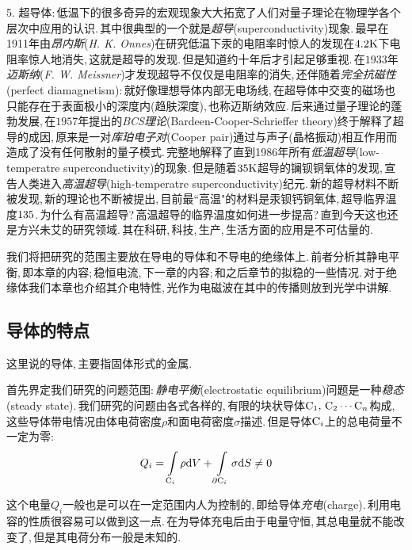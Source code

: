 	\vspace{0.3cm} 5. 超导体:\,低温下的很多奇异的宏观现象大大拓宽了人们对量子理论在物理学各个层次中应用的认识.\,其中很典型的一个就是\emph{超导}(superconductivity)现象.\,最早在1911年由\emph{昂内斯}({\it H. K. Onnes})在研究低温下汞的电阻率时惊人的发现在$4.2{\rm K}$下电阻率惊人地消失,\,这就是超导的发现.\,但是知道约十年后才引起足够重视.\,在$1933$年\emph{迈斯纳}({\it F. W. Meissner})才发现超导不仅仅是电阻率的消失,\,还伴随着\emph{完全抗磁性}(perfect diamagnetism):\,就好像理想导体内部无电场线,\,在超导体中交变的磁场也只能存在于表面极小的深度内(趋肤深度),\,也称迈斯纳效应.\,后来通过量子理论的蓬勃发展,\,在$1957$年提出的\emph{BCS理论}(Bardeen-Cooper-Schrieffer theory)终于解释了超导的成因,\,原来是一对\emph{库珀电子对}(Cooper pair)通过与声子(晶格振动)相互作用而造成了没有任何散射的量子模式.\,完整地解释了直到1986年所有\emph{低温超导}(low-temperatre superconductivity)的现象.\,但是随着$35{\rm K}$超导的镧钡铜氧体的发现,\,宣告人类进入\emph{高温超导}(high-temperatre superconductivity)纪元.\,新的超导材料不断被发现,\,新的理论也不断被提出,\,目前最``高温"的材料是汞钡钙铜氧体,\,超导临界温度$135{\rm}$.\,为什么有高温超导?\,高温超导的临界温度如何进一步提高?\,直到今天这也还是方兴未艾的研究领域.\,其在科研,\,科技,\,生产,\,生活方面的应用是不可估量的.

\vspace{0.5cm}

我们将把研究的范围主要放在导电的导体和不导电的绝缘体上.\,前者分析其静电平衡,\,即本章的内容;\,稳恒电流,\,下一章的内容;\,和之后章节的拟稳的一些情况.\,对于绝缘体我们本章也介绍其介电特性,\,光作为电磁波在其中的传播则放到光学中讲解.

\subsection{导体的特点}

这里说的导体,\,主要指固体形式的金属.

首先界定我们研究的问题范围:\,\emph{静电平衡}(electrostatic equilibrium)问题是一种\emph{稳态}(steady state).\,我们研究的问题由各式各样的,\,有限的块状导体${\rm C}_1,\,{\rm C}_2\cdots {\rm C}_n$构成,\,这些导体带电情况由体电荷密度$\rho$和面电荷密度$\sigma$描述.\,但是导体${\rm C}_i$上的总电荷量不一定为零:
\[Q_i=\int\limits_{{\rm C}_i}\rho \textrm{d} V+\int\limits_{\partial{\rm C}_i}\sigma \textrm{d} S\neq 0\]

这个电量$Q_i$一般也是可以在一定范围内人为控制的,\,即给导体\emph{充电}(charge).\,利用电容的性质很容易可以做到这一点.\,在为导体充电后由于电量守恒,\,其总电量就不能改变了,\,但是其电荷分布一般是未知的.


